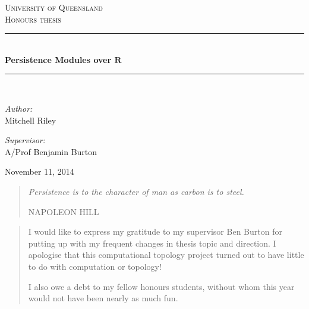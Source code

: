 \documentclass[12pt,a4paper]{article}
\theoremstyle{definition}
\begin{document}

\newcommand{\HRule}{\rule{\linewidth}{0.5mm}}
\begin{titlepage}
\begin{center}
\textsc{\LARGE University of Queensland}\\[0.5cm]
\textsc{\Large Honours thesis}\\[1.5cm]

\HRule \\[0.4cm]
{ \huge \bfseries Persistence Modules over $\mathbf{R}$ \\[0.4cm] }

\HRule \\[1.5cm]

\noindent
\begin{minipage}{0.4\textwidth}
\begin{flushleft} \large
\emph{Author:}\\
Mitchell Riley
\end{flushleft}
\end{minipage}%
\begin{minipage}{0.4\textwidth}
\begin{flushright} \large
\emph{Supervisor:} \\
A/Prof Benjamin Burton
\end{flushright}
\end{minipage}

\vfill

{\large November 11, 2014}

\end{center}
\end{titlepage}

\clearpage
\vspace*{\fill}
\begin{quotation}
\emph{Persistence is to the character of man as carbon is to steel.}

\medskip
\raggedleft
\MakeUppercase{Napoleon Hill}

\end{quotation}
\vspace*{\fill}
\vspace*{\fill}
\newpage

\null\vspace{\fill} 
\renewcommand{\abstractname}{Acknowledgements}
\begin{abstract}
I would like to express my gratitude to my supervisor Ben Burton for putting up with my frequent changes in thesis topic and direction. I apologise that this computational topology project turned out to have little to do with computation or topology!

I also owe a debt to my fellow honours students, without whom this year would not have been nearly as much fun.	
\end{abstract}
\vspace{\fill}
\end{document}
